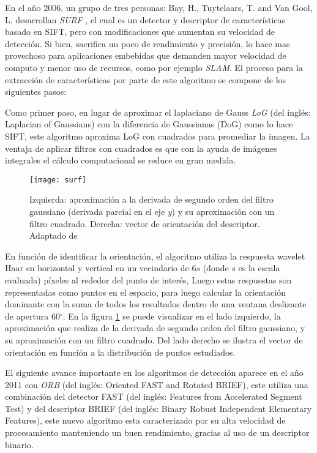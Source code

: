 En el año 2006, un grupo de tres personas: Bay, H., Tuytelaars, T. and Van Gool, L. desarrollan \textit{SURF} \cite{surf}, el cual es un detector y descriptor de características basado en SIFT, pero con modificaciones que aumentan su velocidad de detección. Si bien, sacrifica un poco de rendimiento y precisión, lo hace mas provechoso para aplicaciones embebidas que demanden mayor velocidad de computo y menor uso de recursos, como por ejemplo \textit{SLAM}. El proceso para la extracción de características por parte de este algoritmo se compone de los siguientes pasos:

Como primer paso, en lugar de aproximar el laplaciano de Gauss \textit{LoG} (del inglés: Laplacian of Gaussians) con la diferencia de Gaussianas (DoG) como lo hace SIFT, este algoritmo aproxima LoG con cuadrados para promediar la imagen. La ventaja de aplicar filtros con cuadrados es que con la ayuda de imágenes integrales el cálculo computacional se reduce en gran medida.

\begin{figure}[H]
	\centering
	\texttt{[image: surf]}
	\caption[Detector y descriptor SURF]{Izquierda: aproximación a la derivada de segundo orden del filtro gaussiano (derivada parcial en el eje \textit{y}) y su aproximación con un filtro cuadrado. Derecha: vector de orientación del descriptor. Adaptado de \cite{surf}}
	\label{imagen:surf}
\end{figure}

En función de identificar la orientación, el algoritmo utiliza la respuesta wavelet Haar en horizontal y vertical en un vecindario de 6$s$ (donde $s$ es la escala evaluada) píxeles al rededor del punto de interés, Luego estas respuestas son representadas como puntos en el espacio, para luego calcular la orientación dominante con la suma de todos los resultados dentro de una ventana deslizante de apertura 60$^\circ$. En la figura \ref{imagen:surf} se puede visualizar en el lado izquierdo, la aproximación que realiza de la derivada de segundo orden del filtro gaussiano, y su aproximación con un filtro cuadrado. Del lado derecho se ilustra el vector de orientación en función a la distribución de puntos estudiados.

El siguiente avance importante en los algoritmos de detección aparece en el año 2011 con \textit{ORB} \cite{orb} (del inglés: Oriented FAST and Rotated BRIEF), este utiliza una combinación del detector FAST (del inglés: Features from Accelerated Segment Test) y del descriptor BRIEF (del inglés: Binary Robust Independent Elementary Features), este nuevo algoritmo esta caracterizado por su alta velocidad de procesamiento manteniendo un buen rendimiento, gracias al uso de un descriptor binario. 

